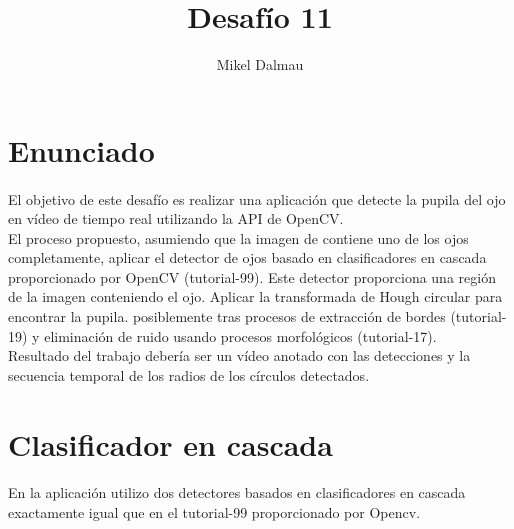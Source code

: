 \documentclass[es,gi]{ifirak}\usepackage[]{graphicx}\usepackage[]{color}
\begin{document}
\title{Desafío 11}
\author{Mikel Dalmau}

\maketitle




\tableofcontents

\section{Enunciado}
\paragraph{}El objetivo de este desafío es realizar una aplicación que detecte la pupila del ojo en  vídeo de tiempo real utilizando la API de OpenCV.\\

El proceso propuesto, asumiendo que la imagen de  contiene uno de los ojos completamente, aplicar el detector de ojos basado en clasificadores en cascada proporcionado por OpenCV (tutorial-99). Este detector proporciona una región de la imagen conteniendo el ojo. Aplicar la transformada de Hough circular para encontrar la pupila. posiblemente tras procesos de extracción de bordes (tutorial-19) y eliminación de ruido usando procesos morfológicos (tutorial-17).\\

Resultado del trabajo debería ser un vídeo anotado con las detecciones y la secuencia temporal de los radios de los círculos detectados.\\

\pagebreak
\section{Clasificador en cascada}
\paragraph{}En la aplicación utilizo dos detectores basados en clasificadores en cascada exactamente igual que en el tutorial-99 proporcionado por Opencv.\\
 
\end{document}
